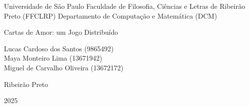 \begin{center} 
    Universidade de São Paulo \linebreak
    Faculdade de Filosofia, Ciências e Letras de Ribeirão Preto (FFCLRP) \linebreak
    Departamento de Computação e Matemática (DCM)
    
    \vfill
    
    \Huge Cartas de Amor: um Jogo Distribuído %
    
    \normalsize
    \vfill
    
    Lucas Cardoso dos Santos (9865492)\\
    Maya Monteiro Lima (13671942)\\
    Miguel de Carvalho Oliveira  (13672172)\\

    \vfill
    
    Ribeirão Preto
    
    2025
    
\end{center} %
